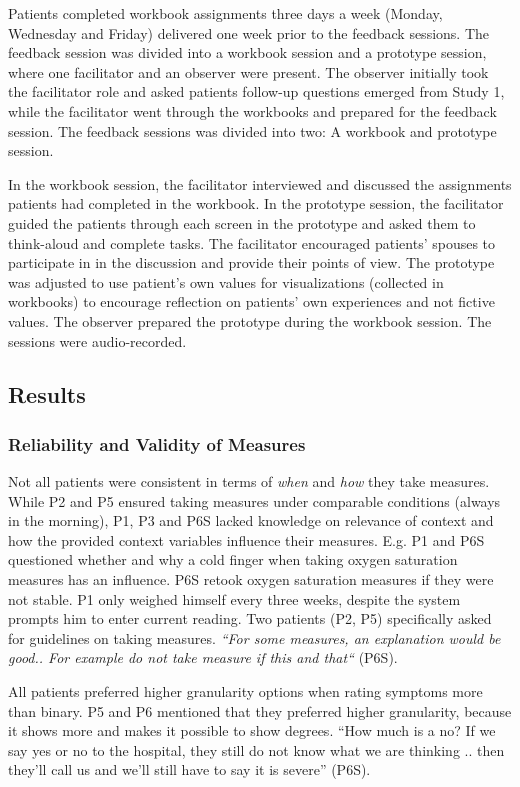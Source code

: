 Patients completed workbook assignments three days a week (Monday, Wednesday and Friday) delivered one week prior to the feedback sessions. The feedback session was divided into a workbook session and a prototype session, where one facilitator and an observer were present. The observer initially took the facilitator role and asked patients follow-up questions emerged from Study 1, while the facilitator went through the workbooks and prepared for the feedback session. The feedback sessions was divided into two: A workbook and prototype session. 

In the workbook session, the facilitator interviewed and discussed the assignments patients had completed in the workbook. In the prototype session, the facilitator guided the patients through each screen in the prototype and asked them to think-aloud and complete tasks. The facilitator encouraged patients’ spouses to participate in in the discussion and provide their points of view. The prototype was adjusted to use patient’s own values for visualizations (collected in workbooks) to encourage reflection on patients’ own experiences and not fictive values. The observer prepared the prototype during the workbook session. The sessions were audio-recorded. 

\subsection{Results}     

\subsubsection{Reliability and Validity of Measures}
Not all patients were consistent in terms of \textit{when} and \textit{how} they take measures. While P2 and P5 ensured taking measures under comparable conditions (always in the morning), P1, P3 and P6S lacked knowledge on relevance of context and how the provided context variables influence their measures. E.g. P1 and P6S questioned whether and why a cold finger when taking oxygen saturation measures has an influence. P6S retook oxygen saturation measures if they were not stable. P1 only weighed himself every three weeks, despite the system prompts him to enter current reading. Two patients (P2, P5) specifically asked for guidelines on taking measures. \textit{“For some measures, an explanation would be good.. For example do not take measure if this and that“} (P6S). 

All patients preferred higher granularity options when rating symptoms more than binary. P5 and P6 mentioned that they preferred higher granularity, because it shows more and makes it possible to show degrees. “How much is a no? If we say yes or no to the hospital, they still do not know what we are thinking .. then they’ll call us and we’ll still have to say it is severe” (P6S). 

